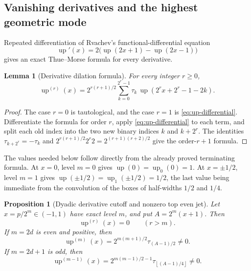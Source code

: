 \documentclass[11pt,oneside]{article}
\newtheorem{proposition}[theorem]{Proposition}
\newtheorem{lemma}[theorem]{Lemma}
\theoremstyle{definition}
\theoremstyle{remark}
\newcommand{\up}{\operatorname{up}}
\newcommand{\floor}[1]{\left\lfloor#1\right\rfloor}
\begin{document}
\subsection{Vanishing derivatives and the highest geometric mode}

Repeated differentiation of Rvachev's functional-differential equation
\begin{equation}\label{eq:up-differential}
 \up'(x)=2\bigl(\up(2x+1)-\up(2x-1)\bigr)
\end{equation}
gives an exact Thue--Morse formula for every derivative.

\begin{lemma}[Derivative dilation formula]\label{lem:derivative-formula}
For every integer \(r\ge0\),
\begin{equation}\label{eq:derivative-formula}
 \boxed{\displaystyle
 \up^{(r)}(x)=2^{r(r+1)/2}
 \sum_{k=0}^{2^r-1}\tau_k\,
 \up\!\left(2^rx+2^r-1-2k\right).}
\end{equation}
\end{lemma}

\begin{proof}
The case \(r=0\) is tautological, and the case \(r=1\) is
\eqref{eq:up-differential}.  Differentiate the formula for order \(r\), apply
\eqref{eq:up-differential} to each term, and split each old index into the two
new binary indices \(k\) and \(k+2^r\).  The identities
\(\tau_{k+2^r}=-\tau_k\) and
\(2^{r(r+1)/2}2^r2=2^{(r+1)(r+2)/2}\) give the order-\(r+1\) formula.
\end{proof}

The values needed below follow directly from the already proved terminating
formula.  At \(x=0\), level \(m=0\) gives \(\up(0)=\up_0(0)=1\).  At
\(x=\pm1/2\), level \(m=1\) gives \(\up(\pm1/2)=\up_1(\pm1/2)=1/2\), the
last value being immediate from the convolution of the boxes of half-widths
\(1/2\) and \(1/4\).

\begin{proposition}[Dyadic derivative cutoff and nonzero top even jet]\label{prop:top-jet}
Let \(x=p/2^m\in(-1,1)\) have exact level \(m\), and put
\(A=2^m(x+1)\).  Then
\begin{equation}\label{eq:derivative-cutoff}
 \up^{(r)}(x)=0\qquad(r>m).
\end{equation}
If \(m=2d\) is even and positive, then
\begin{equation}\label{eq:top-even-evenlevel}
 \up^{(m)}(x)=2^{m(m+1)/2}\tau_{(A-1)/2}\ne0.
\end{equation}
If \(m=2d+1\) is odd, then
\begin{equation}\label{eq:top-even-oddlevel}
 \up^{(m-1)}(x)=
 2^{m(m-1)/2-1}\tau_{\floor{(A-1)/4}}\ne0.
\end{equation}
\end{proposition}
\end{document}
